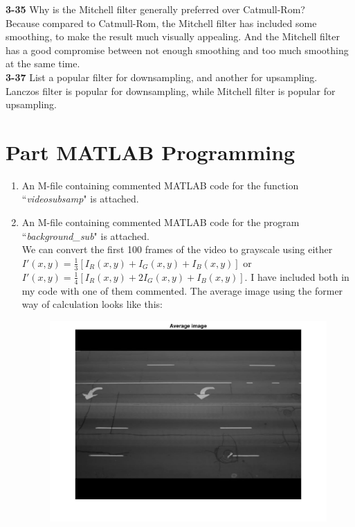 \documentclass[a4paper]{article}
\begin{document}
\begin{spacing}{2.0}
	\noindent
	\textbf{3-35} Why is the Mitchell filter generally preferred over Catmull-Rom?\\
	
	Because compared to Catmull-Rom, the Mitchell filter has included some smoothing, to make the result much visually appealing. And the Mitchell filter has a good compromise between not enough smoothing and too much smoothing at the same time. \\
	
	\noindent
	\textbf{3-37} List a popular filter for downsampling, and another for upsampling.\\
	
	 Lanczos filter is popular for downsampling, while Mitchell filter is popular for upsampling. 

\newpage	
\section*{\huge\textbf{ Part \uppercase\expandafter{} MATLAB Programming} }
	\normalsize
	\begin{enumerate}
	\item An M-file containing commented MATLAB code for the function ``\emph{videosubsamp}" is attached. 
	\item An M-file containing commented MATLAB code for the program  ``\emph{background\_sub}" is attached. 	\\
	We can convert the first 100 frames of the video to grayscale using either $I'(x, y) = \displaystyle\frac{1}{3}[I_R(x,y) + I_G(x,y) +I_B(x,y)]$ or $I'(x, y) = \displaystyle\frac{1}{4}[I_R(x,y) + 2I_G(x,y) +I_B(x,y)]$. I have included both in my code with one of them commented. The average image using the former way of calculation looks like this:\\
	\begin{figure}[H]
		\centering
		\includegraphics[width=5in]{1.jpg}

\end{figure}
\end{enumerate}
\end{spacing}
\end{document}
